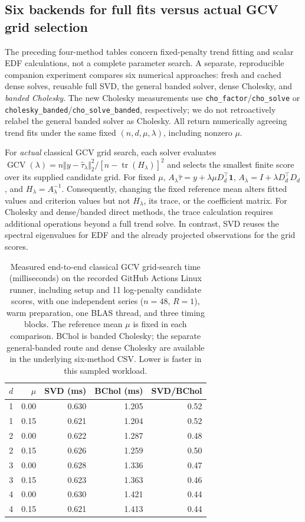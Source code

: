 \subsection{Six backends for full fits versus actual GCV grid selection}\label{sec:gcv-grid-reuse}
The preceding four-method tables concern fixed-penalty trend fitting and
scalar EDF calculations, not a complete parameter search. A separate,
reproducible companion experiment compares six numerical approaches:
fresh and cached dense solves, reusable full SVD, the general banded
solver, dense Cholesky, and \emph{banded Cholesky}. The new Cholesky
measurements use \texttt{cho\_factor}/\texttt{cho\_solve} or
\texttt{cholesky\_banded}/\texttt{cho\_solve\_banded}, respectively;
we do not retroactively relabel the general banded solver as Cholesky.
All return numerically agreeing trend fits under the same fixed
$(n,d,\mu,\lambda)$, including nonzero $\mu$.

For \emph{actual} classical GCV grid search, each solver evaluates
$\operatorname{GCV}(\lambda)=n\Vert y-\widehat\tau_\lambda\Vert_2^2/
[n-\operatorname{tr}(H_\lambda)]^2$ and selects the smallest
finite score over its supplied candidate grid. For fixed $\mu$,
$A_\lambda\widehat\tau=y+\lambda\mu D_d^\top\mathbf1$,
$A_\lambda=I+\lambda D_d^\top D_d$, and
$H_\lambda=A_\lambda^{-1}$. Consequently, changing the fixed
reference mean alters fitted values and criterion values but not
$H_\lambda$, its trace, or the coefficient matrix. For Cholesky
and dense/banded direct methods, the trace calculation requires
additional operations beyond a full trend solve. In contrast, SVD
reuses the spectral eigenvalues for EDF and the already projected
observations for the grid scores.

\begin{table}[tbp]
\centering
\caption{Measured end-to-end classical GCV grid-search time (milliseconds) on the recorded GitHub Actions Linux runner, including setup and 11 log-penalty candidate scores, with one independent series ($n=48$, $R=1$), warm preparation, one BLAS thread, and three timing blocks. The reference mean $\mu$ is fixed in each comparison. BChol is banded Cholesky; the separate general-banded route and dense Cholesky are available in the underlying six-method CSV. Lower is faster in this sampled workload.}
\label{tab:gcv-six-d}
\begin{tabular}{rrrrr}
\toprule
$d$ & $\mu$ & SVD (ms) & BChol (ms) & SVD/BChol \\
\midrule
1 & 0.00 & 0.630 & 1.205 & 0.52 \\
1 & 0.15 & 0.621 & 1.204 & 0.52 \\
2 & 0.00 & 0.622 & 1.287 & 0.48 \\
2 & 0.15 & 0.626 & 1.259 & 0.50 \\
3 & 0.00 & 0.628 & 1.336 & 0.47 \\
3 & 0.15 & 0.623 & 1.363 & 0.46 \\
4 & 0.00 & 0.630 & 1.421 & 0.44 \\
4 & 0.15 & 0.621 & 1.413 & 0.44 \\
\bottomrule
\end{tabular}
\end{table}

